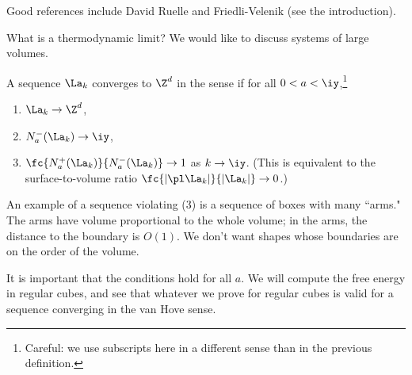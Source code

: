 

Good references include David Ruelle and Friedli-Velenik (see the introduction).

What is a thermodynamic limit? We would like to discuss systems of large volumes.
\begin{df}
A sequence $\La_k$ converges to $\Z^d$ in the  sense if for all $0<a<\iy$,\footnote{Careful: we use subscripts here in a different sense than in the previous definition.}
\begin{enumerate}
\item
$\La_k\to \Z^d$,
\item
$N_a^-(\La_k) \to \iy$,
\item
$\fc{N_a^+(\La_k)}{N_a^-(\La_k)}\to 1$ as $k\to \iy$. (This is equivalent to the surface-to-volume ratio $\fc{|\pl \La_k|}{|\La_k|}\to 0$.)
\end{enumerate}
\end{df}
An example of a sequence violating (3) is a sequence of boxes with many ``arms." The arms have volume proportional to the whole volume; in the arms, the distance to the boundary is $O(1)$. We don't want shapes whose boundaries are on the order of the volume.

It is important that the conditions hold for all $a$. %
We will compute the free energy in regular cubes, and see that whatever we prove for regular cubes is valid for a sequence converging in the van Hove sense.

